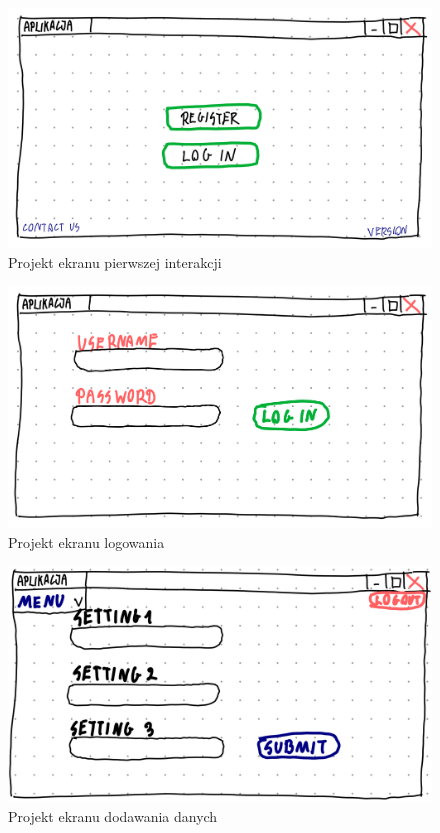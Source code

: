 \documentclass[a4paper,10pt, twoside]{report}
\begin{document}
\begin{large}
\begin{figure}[H]           %
    \centering
    \includegraphics[width=12cm]{figures/Righten_UI_sketch_startscreen.png}
    \caption{Projekt ekranu pierwszej interakcji}
    \label{fig:uiprojectstart}
\end{figure}

\begin{figure}[H]           %
    \centering
    \includegraphics[width=12cm]{figures/Righten_UI_sketch_loginscreen.png}
    \caption{Projekt ekranu logowania}
    \label{fig:uiprojectlogin}
\end{figure}

\begin{figure}[H]           %
    \centering
    \includegraphics[width=12cm]{figures/Righten_UI_sketch_settings.png}
    \caption{Projekt ekranu dodawania danych}
    \label{fig:uiprojectsettings}
\end{figure}


\end{large}
\end{document}
